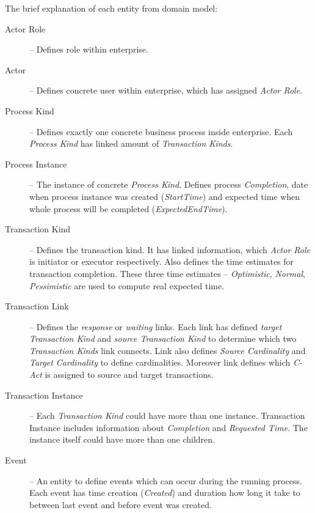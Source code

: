 The brief explanation of each entity from domain model:
\begin{description}
\item[Actor Role] -- Defines role within enterprise. 
\item[Actor] -- Defines concrete user within enterprise, which has assigned \textit{Actor Role}.

\item[Process Kind] -- Defines exactly one concrete business process inside enterprise. Each \textit{Process Kind} has linked amount of \textit{Transaction Kinds}.

\item[Process Instance] -- The instance of concrete \textit{Process Kind}. Defines process \textit{Completion}, date when process instance was created (\textit{StartTime}) and expected time when whole process will be completed (\textit{ExpectedEndTime}).

\item[Transaction Kind] -- Defines the transaction kind. It has linked information, which \textit{Actor Role} is initiator or executor respectively. Also defines the time estimates for transaction completion. These three time estimates -- \textit{Optimistic}, \textit{Normal}, \textit{Pessimistic} are used to compute real expected time. 

\item[Transaction Link] -- Defines the \textit{response} or \textit{waiting} links. Each link has defined \textit{target Transaction Kind}  and \textit{source Transaction Kind} to determine which two \textit{Transaction Kinds} link connects. Link also defines \textit{Source Cardinality} and \textit{Target Cardinality} to define cardinalities. Moreover link defines which \textit{C-Act} is assigned to source and target transactions.  

\item[Transaction Instance] -- Each \textit{Transaction Kind} could have more than one instance. Transaction Instance includes information about \textit{Completion} and \textit{Requested Time}. The instance itself could have more than one children. 

\item[Event] -- An entity to define events which can occur during the running process. Each event has time creation (\textit{Created}) and duration how long it take to between last event and before event was created.

\end{description}

